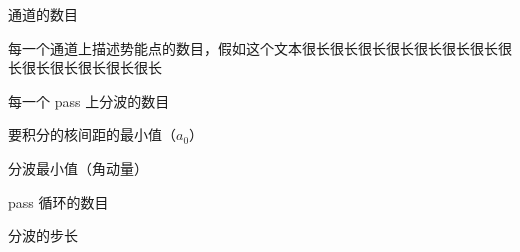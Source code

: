 \documentclass[UTF8]{ctexart}
\begin{document}
\begin{description}[style=multiline,
					labelwidth=\widthof{npassx},
					leftmargin=\labelwidth]
  \item[nch  ] 通道的数目
  \item[ndat ] 每一个通道上描述势能点的数目，假如这个文本很长很长很长很长很长很长很长很长很长很长很长很长很长
  \item[npar ] 每一个 pass 上分波的数目
  \item[rstar] 要积分的核间距的最小值（$a_0$）
  \item[jmin ] 分波最小值（角动量）
  \item[npass] pass 循环的数目
  \item[jstep] 分波的步长
\end{description}
\end{document}
